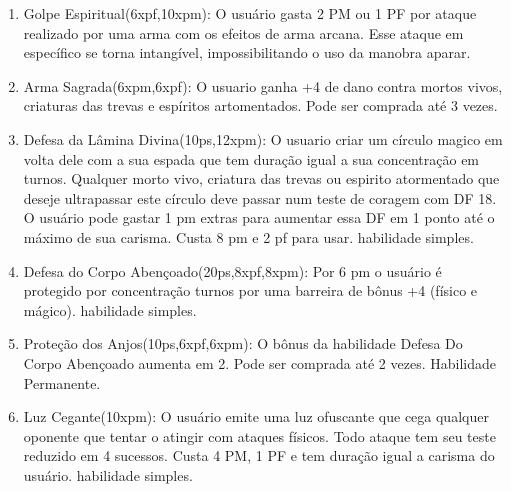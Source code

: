 \begin{enumerate}
  \item Golpe Espiritual(6xpf,10xpm): O usuário gasta 2 PM ou 1 PF por ataque realizado por uma arma com os efeitos de arma arcana. Esse ataque em específico se torna intangível, impossibilitando o uso da manobra aparar.    
        	
  
  	\item Arma Sagrada(6xpm,6xpf): O usuario ganha +4 de dano contra mortos vivos, criaturas das trevas e espíritos artomentados. Pode ser comprada até 3 vezes.
 
 		\item Defesa da Lâmina Divina(10ps,12xpm): O usuario criar um círculo magico em volta dele com a sua espada que tem duração igual a sua concentração em turnos. Qualquer morto vivo, criatura das trevas ou espirito atormentado que deseje ultrapassar este círculo deve passar num teste de coragem com DF 18. O usuário pode gastar 1 pm extras para aumentar essa DF em 1 ponto até o máximo de sua carisma. Custa 8 pm e 2 pf para usar. habilidade simples.
 
 	\item Defesa do Corpo Abençoado(20ps,8xpf,8xpm): Por 6 pm o usuário é protegido por concentração turnos por uma barreira de bônus +4 (físico e mágico). habilidade simples.

	\item Proteção dos Anjos(10ps,6xpf,6xpm): O bônus da habilidade Defesa Do Corpo Abençoado aumenta em 2. Pode ser comprada até 2 vezes. Habilidade Permanente.
  	
	\item Luz Cegante(10xpm): O usuário emite uma luz ofuscante que cega qualquer oponente que tentar o atingir com ataques físicos. Todo ataque tem seu teste reduzido em 4 sucessos. Custa 4 PM, 1 PF e tem duração igual a carisma do usuário. habilidade simples.
 

\end{enumerate}
